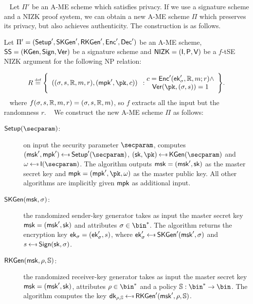 ~\newline
Let $\Pi'$ be an A-ME scheme which satisfies privacy. If we use a signature scheme and a NIZK proof system, we can obtain a new A-ME scheme $\Pi$ which preserves its privacy, but also achieves authenticity. The construction is as follows.

\begin{construction}\label{constr:ame_nizk}
    Let $\Pi'=(\mathsf{Setup}',\mathsf{SKGen}',\mathsf{RKGen}', \mathsf{Enc}',\mathsf{Dec}')$ be an A-ME scheme, $\mathsf{SS} =(\mathsf{KGen},\mathsf{Sign},\mathsf{Ver})$ be a signature scheme and $\mathsf{NIZK}=(\mathsf{I}, \mathsf{P}, \mathsf{V})$ be a $f$-tSE NIZK argument for the following NP relation:

    \[
        R \eqdef \Biggl\{ \begin{array}{c}((\sattr, \signature, \raccess, \msg, r),(\mpk', \pk, \cipher))\end{array}:\begin{array}{@{}c}
            \cipher = \enc'(\ek'_\sattr, \raccess, \msg; r) \land \\
            \ver(\pk, (\sattr, \signature)) = 1
        \end{array} \Biggr\}.
    \]
    ~\newline
    where $f(\sigma, s, \mathbb{R}, m, r) = (\sigma, s, \mathbb{R}, m)$, so $f$ extracts all the input but the randomness $r$.
    ~\newline\newline
    We construct the new A-ME scheme $\Pi$ as follows:
    \begin{description}
        \item[$\setup(\secparam)$:] on input the security parameter $\secparam$, computes $(\msk', \mpk') \getsr \setup'(\secparam)$, $(\sk, \pk) \getsr \kgen(\secparam)$ and $\crs \getsr \init(\secparam)$. The algorithm outputs $\mathsf{msk} = (\mathsf{msk}', \mathsf{sk})$ as the master secret key and $\mpk = (\mpk', \pk, \crs)$ as the master public key. All other algorithms are implicitly given $\mathsf{mpk}$ as additional input.
        \item[$\mathsf{SKGen}(\mathsf{msk}, \sigma)$:] the randomized sender-key generator takes as input the master secret key $\mathsf{msk} = (\mathsf{msk}', \mathsf{sk})$ and attributes $\sattr \in \bin^*$. The algorithm returns the encryption key $\mathsf{ek}_\sigma = (\mathsf{ek}'_\sigma, s)$, where $\ek'_\sattr \getsr \skgen'(\msk', \sattr)$ and $\signature \getsr \sign(\sk, \sattr)$.
        \item[$\mathsf{RKGen}(\mathsf{msk}, \rho, \mathbb{S})$:] the randomized receiver-key generator takes as input the master secret key $\mathsf{msk} = (\mathsf{msk}', \mathsf{sk})$, attributes $\rattr \in \bin^*$ and a policy $\saccess:\bin^* \to \bin$. The algorithm computes the key $\dk_{\rattr, \saccess} \getsr \rkgen'(\msk', \rattr, \saccess)$.

\end{description}
\end{construction}
